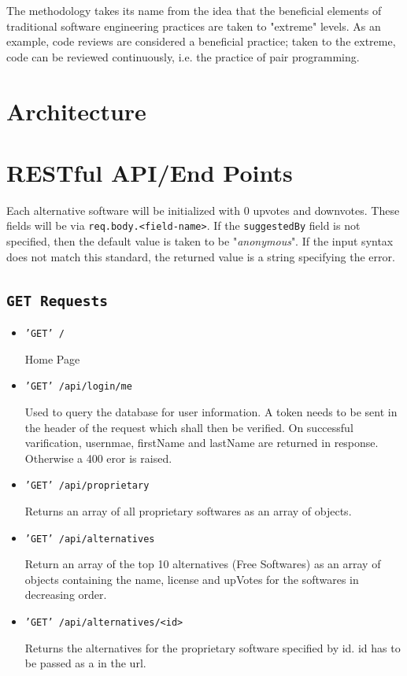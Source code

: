 The methodology takes its name from the idea that the beneficial elements of traditional software engineering practices are taken to "extreme" levels. As an example, code reviews are considered a beneficial practice; taken to the extreme, code can be reviewed continuously, i.e. the practice of pair programming.

\section{Architecture}

\section{RESTful API/End Points}


Each alternative software will be initialized with 0 upvotes and downvotes. These fields will be via \texttt{req.body.<field-name>}. If the \texttt{suggestedBy} field is not specified, then the default value is taken to be "\textsl{anonymous}". If the input syntax does not match this standard, the returned value is a string specifying the error.

\subsection{\texttt{GET Requests}}

\begin{itemize}

\item{\texttt{'GET' /}}

Home Page

\item{\texttt{'GET' /api/login/me}}

Used to query the database for user information. A token needs to be sent in the header of the request which shall then be verified. On successful varification, usernmae, firstName and lastName are returned in response. Otherwise a 400 eror is raised.

\item{\texttt{'GET' /api/proprietary}}

Returns an array of all proprietary softwares as an array of objects.

\item{\texttt{'GET' /api/alternatives}}

Return an array of the top 10 alternatives (Free Softwares) as an array of objects containing the name, license and upVotes for the softwares in decreasing order.

\item{\texttt{'GET' /api/alternatives/<id>}}

Returns the alternatives for the proprietary software specified by id. id has to be passed as a in the url.

\end{itemize}

